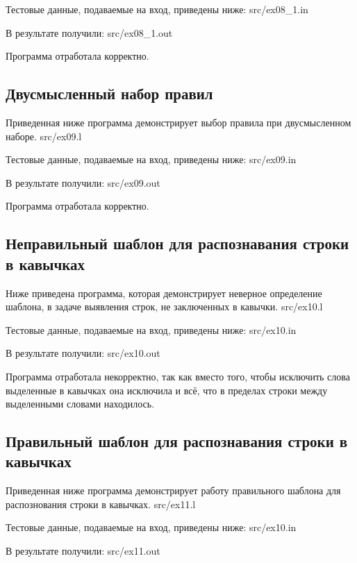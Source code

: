     Тестовые данные, подаваемые на вход, приведены ниже:
     {src/ex08_1.in}
    
    В результате получили:
     {src/ex08_1.out}

    Программа отработала корректно.

\subsection{Двусмысленный набор правил}
    Приведенная ниже программа демонстрирует выбор правила при двусмысленном наборе.
     {src/ex09.l}

    Тестовые данные, подаваемые на вход, приведены ниже:
     {src/ex09.in}
    
    В результате получили:
     {src/ex09.out}

    Программа отработала корректно.

\subsection{Неправильный шаблон для распознавания строки в кавычках}
    Ниже приведена программа, которая демонстрирует неверное определение
    шаблона, в задаче выявления строк, не заключенных в кавычки.
     {src/ex10.l}

    Тестовые данные, подаваемые на вход, приведены ниже:
     {src/ex10.in}
    
    В результате получили:
     {src/ex10.out}

    Программа отработала некорректно, так как вместо того, чтобы исключить слова 
    выделенные в кавычках она исключила и всё, что в пределах строки между выделенными 
    словами находилось.

\subsection{Правильный шаблон для распознавания строки в кавычках}
    
    Приведенная ниже программа демонстрирует работу правильного шаблона для распознования строки в кавычках.
     {src/ex11.l}

    Тестовые данные, подаваемые на вход, приведены ниже:
     {src/ex10.in}
    
    В результате получили:
     {src/ex11.out}

